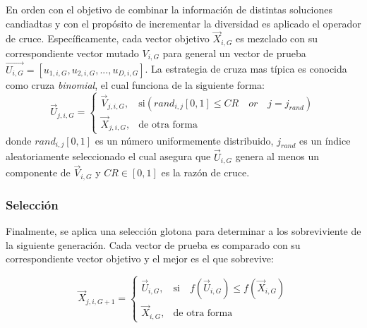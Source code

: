 En orden con el objetivo de combinar la información de distintas soluciones candiadtas y con el propósito de incrementar la diversidad es aplicado el operador de cruce.
%
Específicamente, cada vector objetivo $\vec{X}_{i,G}$ es mezclado con su correspondiente vector mutado $V_{i,G}$ para general un vector de prueba $\vec{U_{i,G}} = [u_{1,i,G},u_{2,i,G}, ..., u_{D,i,G} ]$.
%
La estrategia de cruza mas típica es conocida como cruza \textit{binomial}, el cual funciona de la siguiente forma:
%
\begin{equation} \label{eqn:crossover}
\vec{U}_{j,i,G}= 
\begin{cases}
    \vec{V}_{j,i,G},& \text{si} (rand_{i,j}[0,1] \leq CR \quad or \quad j = j_{rand}  )\\
    \vec{X}_{j,i,G},              & \text{de otra forma}
\end{cases}
\end{equation}
donde $rand_{i,j}[0,1]$ es un número uniformemente distribuido, $j_{rand}$ es un índice aleatoriamente seleccionado el cual asegura que $\vec{U}_{i,G}$ genera al menos un componente de $\vec{V}_{i,G}$ y $CR \in [0,1]$ es la razón de cruce.


\subsubsection{Selección}
Finalmente, se aplica una selección glotona para determinar a los sobreviviente de la siguiente generación.
%
Cada vector de prueba es comparado con su correspondiente vector objetivo y el mejor es el que sobrevive:

\begin{equation} \label{eqn:selection}
\vec{X}_{j,i,G+1}= 
\begin{cases}
    \vec{U}_{i,G},& \text{si} \quad f(\vec{U}_{i,G}) \leq f(\vec{X}_{i,G})  \\
    \vec{X}_{i,G},              & \text{de otra forma}
\end{cases}
\end{equation}

